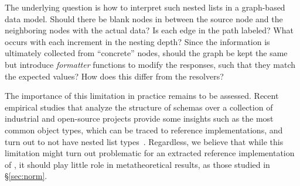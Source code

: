The underlying question is how to interpret such nested lists in a graph-based data model.
Should there be blank nodes in between the source node and the neighboring nodes with the actual data? Is each edge in the path labeled?
What occurs with each increment in the nesting depth? Since the information is ultimately collected from ``concrete'' nodes, should the graph be kept the same 
but introduce \textit{formatter} functions to modify the responses, such that they match the expected values? How does this differ from the \gql resolvers?


The importance of this limitation in practice remains to be assessed. Recent empirical studies that analyze the structure of \gql schemas 
over a collection of industrial and open-source projects provide some 
insights such as the most 
common object types, which can be traced to reference implementations, and turn out to not have nested list types~\cite{empiricalgql,empiricalapi}. 
Regardless, we believe that while this limitation might turn out problematic for an extracted reference implementation of \gql, it should play little role in metatheoretical results, as those studied in \S\ref{sec:norm}.





